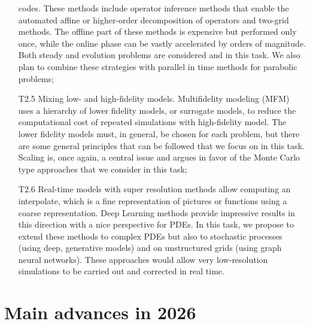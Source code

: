 \begin{itemize}
  codes. These methods include  operator inference methods that enable
  the automated affine or  higher-order decomposition of operators and
  two-grid methods. The offline part of these methods is expensive but
  performed  only  once,   while  the  online  phase   can  be  vastly
  accelerated  by  orders  of  magnitude. Both  steady  and  evolution
  problems are considered  and in this task.  We also  plan to combine
  these  strategies  with  parallel  in  time  methods  for  parabolic
  problems;
\item[T2.5]  Mixing  low-  and  high-fidelity  models.   Multifidelity
  modeling  (MFM)  uses  a  hierarchy of  lower  fidelity  models,  or
  surrogate  models,  to reduce  the  computational  cost of  repeated
  simulations  with high-fidelity  model.  The  lower fidelity  models
  must, in  general, be chosen  for each  problem, but there  are some
  general principles  that can be  followed that  we focus on  in this
  task. Scaling is, once again, a central issue and argues in favor of
  the Monte Carlo type approaches that we consider in this task;
\item[T2.6]  Real-time  models  with super  resolution  methods  allow
  computing an interpolate, which is a fine representation of pictures
  or functions  using a  coarse representation. Deep  Learning methods
  provide impressive results in this direction with a nice perspective
  for  PDEs.  In  this task,  we propose  to extend  these methods  to
  complex  PDEs   but  also  to  stochastic   processes  (using  deep,
  generative  models) and  on unstructured  grids (using  graph neural
  networks).   These   approaches  would  allow   very  low-resolution
  simulations to be carried out and corrected in real time.
\end{itemize}

\clearpage

\section{Main advances in 2026}
\label{sec:wp2-main-advances-2026}


